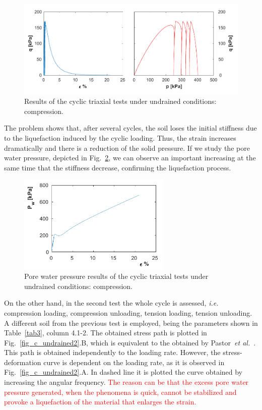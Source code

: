 \documentclass[preprint,12pt,a4paper]{elsarticle}
\begin{document}
\begin{figure}
\centering
\includegraphics[width=1.05\textwidth]{Figs/ciclo_undrained_1.pdf}
\caption{Results of the cyclic triaxial tests under undrained conditions: compression.}
\label{fig_c_undrained1}
\end{figure}

The problem shows that, after several cycles, the soil loses the initial stiffness due to the liquefaction induced by the cyclic loading. Thus, the strain increases dramatically and there is a reduction of the solid pressure. If we study the pore water pressure, depicted in Fig.~\ref{fig_c_undrainedpw}, we can observe an important increasing at the same time that the stiffness decrease, confirming the liquefaction process.

\begin{figure}
\centering
\includegraphics[width=0.65\textwidth]{Figs/ciclo_undrained_pw.pdf}
\caption{Pore water pressure results of the cyclic triaxial tests under undrained conditions: compression.}
\label{fig_c_undrainedpw}
\end{figure}


On the other hand, in the second test the whole cycle is assessed, \textit{i.e.} compression loading, compression unloading, tension loading, tension unloading. A different soil from the previous test is employed, being the parameters shown in Table~\ref{tab3}, column 4.1-2. The obtained stress path  is plotted in Fig.~\ref{fig_c_undrained2}.B, which is equivalent to the obtained by Pastor~\textit{et al.}~\cite{PastorZC:90}.  This path is obtained independently to the loading rate. However, the stress-deformation curve is dependent on the loading rate, as it is observed in Fig.~\ref{fig_c_undrained2}.A. In dashed line it is plotted the curve obtained by increasing the angular frequency. \textcolor{red}{The reason can be that the excess pore water pressure generated,  when the phenomena is quick, cannot be stabilized and provoke a liquefaction of the material that enlarges the strain.}
\end{document}
